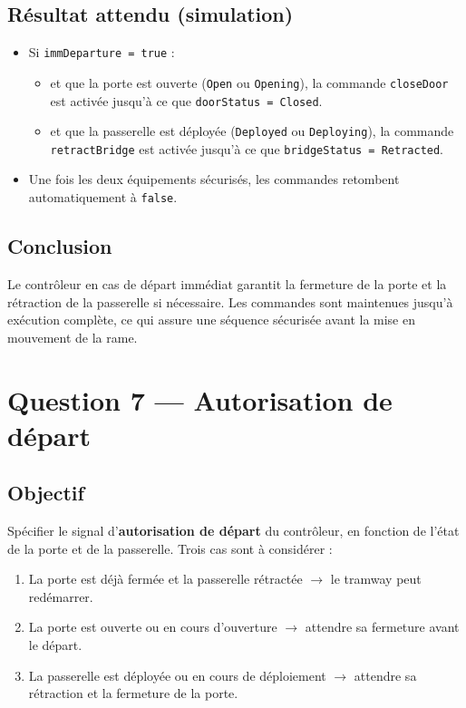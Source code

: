 \documentclass[11pt,a4paper]{report}
\begin{document}
\section*{Résultat attendu (simulation)}
\begin{itemize}
  \item Si \texttt{immDeparture = true} :
  \begin{itemize}
    \item et que la porte est ouverte (\texttt{Open} ou \texttt{Opening}), la commande \texttt{closeDoor} est activée jusqu’à ce que \texttt{doorStatus = Closed}.
    \item et que la passerelle est déployée (\texttt{Deployed} ou \texttt{Deploying}), la commande \texttt{retractBridge} est activée jusqu’à ce que \texttt{bridgeStatus = Retracted}.
  \end{itemize}
  \item Une fois les deux équipements sécurisés, les commandes retombent automatiquement à \texttt{false}.
\end{itemize}

\section*{Conclusion}
Le contrôleur en cas de départ immédiat garantit la fermeture de la porte et la rétraction de la passerelle si nécessaire.  
Les commandes sont maintenues jusqu’à exécution complète, ce qui assure une séquence sécurisée avant la mise en mouvement de la rame.


\chapter{Question 7 — Autorisation de départ}

\section*{Objectif}
Spécifier le signal d’\textbf{autorisation de départ} du contrôleur, en fonction de l’état de la porte et de la passerelle.  
Trois cas sont à considérer :
\begin{enumerate}
  \item La porte est déjà fermée et la passerelle rétractée $\rightarrow$ le tramway peut redémarrer.
  \item La porte est ouverte ou en cours d’ouverture $\rightarrow$ attendre sa fermeture avant le départ.
  \item La passerelle est déployée ou en cours de déploiement $\rightarrow$ attendre sa rétraction et la fermeture de la porte.
\end{enumerate}
\end{document}
